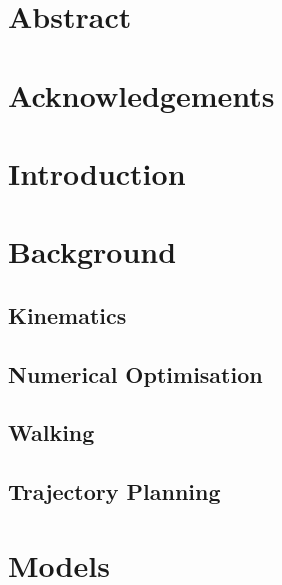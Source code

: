 \documentclass{UoNMCHA}
\begin{document}
	

	\vspace{-5mm}
	\section*{Abstract}
	\vspace{-3mm}
		

	\vspace{-2mm}
	\section*{Acknowledgements}
	\vspace{-3mm}
		

	\newpage\tableofcontents
	
	\newpage\listoffigures\listoftables\listofalgorithms
	
	
	\newpage\section{Introduction}
		

	\clearpage
	\newpage\section{Background}\label{sec:Background}
		
		\subsection{Kinematics}
			
		\subsection{Numerical Optimisation}
			
		\subsection{Walking}
			
		\subsection{Trajectory Planning}
			
	
	\clearpage
	\newpage\section{Models}\label{sec:Models}
		
\end{document}
